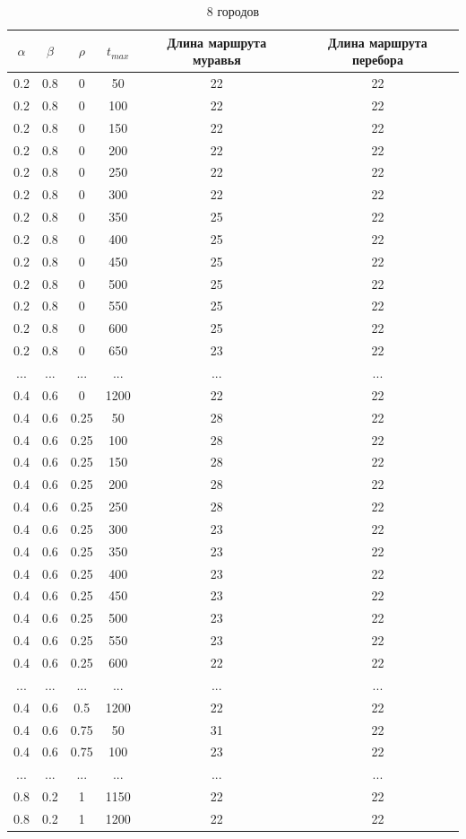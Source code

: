 \documentclass[a4paper,12pt]{article}
\begin{document}
\begin{table}[H]
    \centering
    \caption{8 городов}
    \label{table:city15}
    \begin{tabular}{|c|c|c|c|c|c|}
        \hline
        $\alpha$ & $\beta$ & $\rho$ & $t_{max}$ & Длина маршрута муравья & Длина маршрута перебора \\
        \hline
        0.2 & 0.8 & 0 & 50 & 22 & 22 \\
        0.2 & 0.8 & 0 & 100 & 22 & 22 \\
        0.2 & 0.8 & 0 & 150 & 22 & 22 \\
        0.2 & 0.8 & 0 & 200 & 22 & 22 \\
        0.2 & 0.8 & 0 & 250 & 22 & 22 \\
        0.2 & 0.8 & 0 & 300 & 22 & 22 \\
        0.2 & 0.8 & 0 & 350 & 25 & 22 \\
        0.2 & 0.8 & 0 & 400 & 25 & 22 \\
        0.2 & 0.8 & 0 & 450 & 25 & 22 \\
        0.2 & 0.8 & 0 & 500 & 25 & 22 \\
        0.2 & 0.8 & 0 & 550 & 25 & 22 \\
        0.2 & 0.8 & 0 & 600 & 25 & 22 \\
        0.2 & 0.8 & 0 & 650 & 23 & 22 \\
        ... & ... & ... & ... & ... & ... \\
        0.4 & 0.6 & 0 & 1200 & 22 & 22 \\
        0.4 & 0.6 & 0.25 & 50 & 28 & 22 \\
        0.4 & 0.6 & 0.25 & 100 & 28 & 22 \\
        0.4 & 0.6 & 0.25 & 150 & 28 & 22 \\
        0.4 & 0.6 & 0.25 & 200 & 28 & 22 \\
        0.4 & 0.6 & 0.25 & 250 & 28 & 22 \\
        0.4 & 0.6 & 0.25 & 300 & 23 & 22 \\
        0.4 & 0.6 & 0.25 & 350 & 23 & 22 \\
        0.4 & 0.6 & 0.25 & 400 & 23 & 22 \\
        0.4 & 0.6 & 0.25 & 450 & 23 & 22 \\
        0.4 & 0.6 & 0.25 & 500 & 23 & 22 \\
        0.4 & 0.6 & 0.25 & 550 & 23 & 22 \\
        0.4 & 0.6 & 0.25 & 600 & 22 & 22 \\
        ... & ... & ... & ... & ... & ... \\
        0.4 & 0.6 & 0.5 & 1200 & 22 & 22 \\
        0.4 & 0.6 & 0.75 & 50 & 31 & 22 \\
        0.4 & 0.6 & 0.75 & 100 & 23 & 22 \\
        ... & ... & ... & ... & ... & ... \\
        0.8 & 0.2 & 1 & 1150 & 22 & 22 \\
        0.8 & 0.2 & 1 & 1200 & 22 & 22 \\
        \hline
    \end{tabular}
\end{table}
\end{document}
